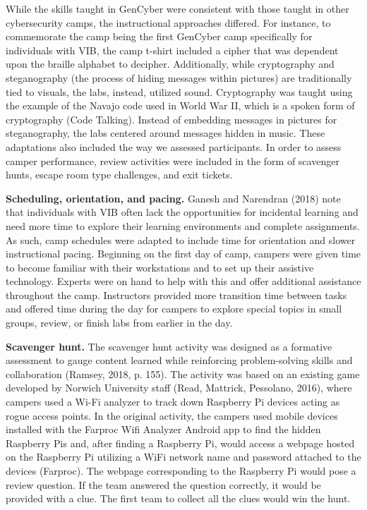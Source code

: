 \documentclass[11.5pt]{sig-alternate} %
\begin{document}
\begin{large}
While the skills taught in GenCyber were consistent with those taught in other cybersecurity camps, the instructional approaches differed. For instance, to commemorate the camp being the first GenCyber camp specifically for individuals with VIB, the camp t-shirt included a cipher that was dependent upon the braille alphabet to decipher. Additionally, while cryptography and steganography (the process of hiding messages within pictures) are traditionally tied to visuals, the labs, instead, utilized sound. Cryptography was taught using the example of the Navajo code used in World War II, which is a spoken form of cryptography (Code Talking). Instead of embedding messages in pictures for steganography, the labs centered around messages hidden in music. These adaptations also included the way we assessed participants. In order to assess camper performance, review activities were included in the form of scavenger hunts, escape room type challenges, and exit tickets. 

\textbf{Scheduling, orientation, and pacing.} Ganesh and Narendran (2018) note that individuals with VIB often lack the opportunities for incidental learning and need more time to explore their learning environments and complete assignments. As such, camp schedules were adapted to include time for orientation and slower instructional pacing. Beginning on the first day of camp, campers were given time to become familiar with their workstations and to set up their assistive technology. Experts were on hand to help with this and offer additional assistance throughout the camp. Instructors provided more transition time between tasks and offered time during the day for campers to explore special topics in small groups, review, or finish labs from earlier in the day. 

\textbf{Scavenger hunt.} The scavenger hunt activity was designed as a formative assessment to gauge content learned while reinforcing problem-solving skills and collaboration (Ramsey, 2018, p. 155). The activity was based on an existing game developed by Norwich University staff (Read, Mattrick, Pessolano, 2016), where campers used a Wi-Fi analyzer to track down Raspberry Pi devices acting as rogue access points. In the original activity, the campers used mobile devices installed with the Farproc Wifi Analyzer Android app to find the hidden Raspberry Pis and, after finding a Raspberry Pi, would access a webpage hosted on the Raspberry Pi utilizing a WiFi network name and password attached to the devices (Farproc). The webpage corresponding to the Raspberry Pi would pose a review question. If the team answered the question correctly, it would be provided with a clue. The first team to collect all the clues would win the hunt.


\end{large}
\end{document}
